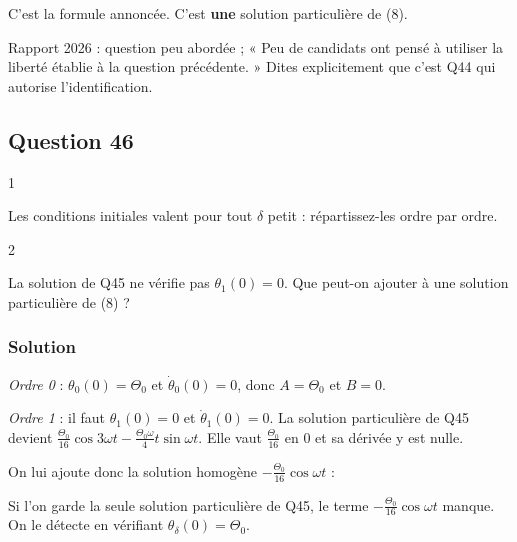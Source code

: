 \documentclass[11pt,a4paper]{article}
\newcommand{\equationajustee}[1]{%
  \sbox{\boiteequation}{$\displaystyle #1$}%
  \ifdim\wd\boiteequation>\linewidth
    \[\resizebox{\linewidth}{!}{\usebox{\boiteequation}}\]%
  \else
    \[#1\]%
  \fi}
\begin{document}
C'est la formule annoncée. C'est \textbf{une} solution particulière de (8).

\begin{jury}

Rapport 2026 : question peu abordée ; « Peu de candidats ont pensé à utiliser la liberté établie à la question précédente. » Dites explicitement que c'est Q44 qui autorise l'identification.

\end{jury}

\hypertarget{question-46}{%
\subsection{Question 46}\label{question-46}}

\begin{indication}{1}

Les conditions initiales valent pour tout \(\delta\) petit : répartissez-les ordre par ordre.

\end{indication}

\begin{indication}{2}

La solution de Q45 ne vérifie pas \(\theta_1(0)=0\). Que peut-on ajouter à une solution particulière de (8) ?

\end{indication}

\hypertarget{solution-45}{%
\subsubsection{Solution}\label{solution-45}}

\emph{Ordre 0} : \(\theta_0(0)=\Theta_0\) et \(\dot\theta_0(0)=0\), donc \(A=\Theta_0\) et \(B=0\).

\emph{Ordre 1} : il faut \(\theta_1(0)=0\) et \(\dot\theta_1(0)=0\). La solution particulière de Q45 devient \(\frac{\Theta_0}{16}\cos3\omega t-\frac{\Theta_0\omega}4t\sin\omega t\). Elle vaut \(\frac{\Theta_0}{16}\) en \(0\) et sa dérivée y est nulle.

On lui ajoute donc la solution homogène \(-\frac{\Theta_0}{16}\cos\omega t\) :

\equationajustee{\boxed{\theta_\delta(t)=\Theta_0\cos\omega t+\delta\Big(\frac{\Theta_0}{16}(\cos3\omega t-\cos\omega t)-\frac{\Theta_0\omega}4t\sin\omega t\Big)+O(\delta^2)}}

\begin{piege}

Si l'on garde la seule solution particulière de Q45, le terme \(-\frac{\Theta_0}{16}\cos\omega t\) manque. On le détecte en vérifiant \(\theta_\delta(0)=\Theta_0\).

\end{piege}
\end{document}
